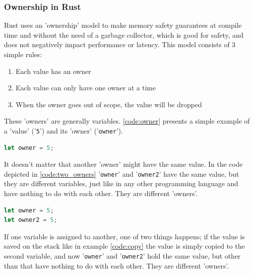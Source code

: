 \subsubsection{Ownership in Rust}

Rust uses an 'ownership' model \cite{rust_ownership} to make memory safety guarantees at compile time and without the need of a garbage collector,
which is good for safety, and does not negatively impact performance or latency.
This model consists of 3 simple rules:
\begin{enumerate}
    \item Each value has an owner
    \item Each value can only have one owner at a time
    \item When the owner goes out of scope, the value will be dropped
\end{enumerate}

These 'owners' are generally variables. \ref{code:owner} presents a simple example of a 'value' ('\lstinline{5}') and its
'owner' ('\lstinline{owner}').\\

\begin{lstlisting}[style=colorEX,language=Rust,caption={Simple example of a value and it's owner},label={code:owner}]
let owner = 5;
\end{lstlisting}

It doesn't matter that another 'owner' might have the same value. In the code depicted in \ref{code:two_owners}
'\lstinline{owner}' and '\lstinline{owner2}' have the same value, but they are different variables, just like in any
other programming language and have nothing to do with each other. They are different 'owners'.\\

\begin{minipage}{\textwidth}
\begin{lstlisting}[style=colorEX,language=Rust,caption={Simple example of two owners},label={code:two_owners}]
let owner = 5;
let owner2 = 5;
\end{lstlisting}
\end{minipage}


If one variable is assigned to another, one of two things happens; if the value is saved on the stack like in
example \ref{code:copy} the value is simply copied to the second variable, and now '\lstinline{owner}' and '\lstinline{owner2}'
hold the same value, but other than that have nothing to do with each other. They are different 'owners'.\\

